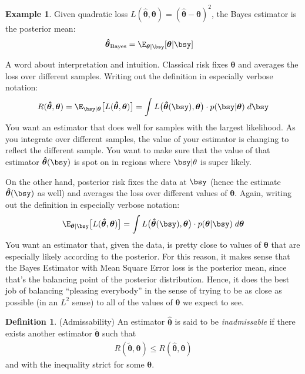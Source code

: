 \documentclass[12pt]{article}
\theoremstyle{plain}
\theoremstyle{definition}
\newtheorem{defn}[thm]{Definition}
\newtheorem{ex}[thm]{Example}
\theoremstyle{remark}
\newcommand{\bstheta}{\boldsymbol{\theta}}
\newcommand{\bshattheta}{\boldsymbol{\hat{\theta}}}
\newcommand{\bstildetheta}{\boldsymbol{\tilde{\theta}}}
\begin{document}
\begin{ex}
Given quadratic loss $L(\bshattheta,\bstheta) =
(\bshattheta-\bstheta)^2$, the Bayes estimator is the posterior mean:
\begin{align*}
  \bshattheta_{\text{Bayes}}
  &= \E_{\bstheta|\bsy}[\bstheta|\bsy]
\end{align*}
\end{ex}

A word about interpretation and intuition. Classical risk fixes
$\bstheta$ and averages the loss over different samples. Writing out the
definition in especially verbose notation:
\begin{align*}
  R(\bshattheta,\bstheta)=
  \E_{\bsy|\bstheta}\big[
    L(\bshattheta,\bstheta)
  \big] =
  \int L\big(\bshattheta(\bsy),\bstheta\big)
    \cdot p(\bsy|\bstheta)\; d\bsy
\end{align*}
You want an estimator that does well for samples with the largest
likelihood. As you integrate over different samples, the value of your
estimator is changing to reflect the different sample. You want to make
sure that the value of that estimator $\bshattheta(\bsy)$ is
spot on in regions where $\bsy|\theta$ is super likely.

On the other hand, posterior risk fixes the data at $\bsy$ (hence
the estimate $\bshattheta(\bsy)$ as well) and averages the loss
over different values of $\bstheta$.
Again, writing out the definition in especially verbose notation:
\begin{align*}
  \E_{\bstheta|\bsy}\big[
    L(\bshattheta,\bstheta)
  \big] =
  \int L\big(\bshattheta(\bsy),\bstheta\big)
    \cdot p(\bstheta|\bsy)\; d\bstheta
\end{align*}
You want an estimator that, given the data, is pretty close to values of
$\bstheta$ that are especially likely according to the posterior.  For
this reason, it makes sense that the Bayes Estimator with Mean Square
Error loss is the posterior mean, since that's the balancing point of
the posterior distribution. Hence, it does the best job of balancing
``pleasing everybody'' in the sense of trying to be as close as possible
(in an $L^2$ sense) to all of the values of $\bstheta$ we expect to see.

\begin{defn}(Admissability)
An estimator $\bshattheta$ is said to be \emph{inadmissable} if there
exists another estimator $\bstildetheta$ such that
\begin{align*}
  R(\bstildetheta,\bstheta)
  \leq
  R(\bshattheta,\bstheta)
\end{align*}
and with the inequality strict for some $\bstheta$.
\end{defn}
\end{document}
